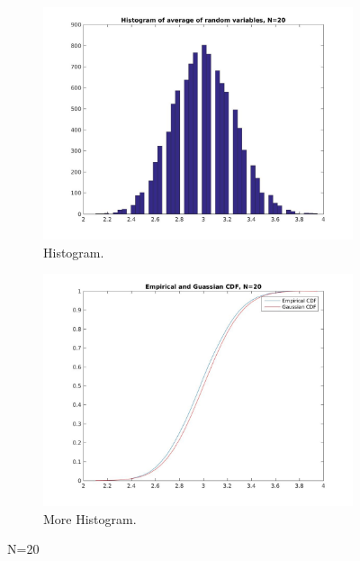 \documentclass[12pt]{article}
\begin{document}
\begin{figure}[h!]
  \centering
  \begin{subfigure}[b]{0.4\linewidth}
    \includegraphics[width=\linewidth]{jpgs/histograms/20_hist.jpg}
    \caption{Histogram.}
  \end{subfigure}
  \begin{subfigure}[b]{0.4\linewidth}
    \includegraphics[width=\linewidth]{jpgs/cdfs/20_cdf.jpg}
    \caption{More Histogram.}
  \end{subfigure}
  \caption{N=20}
\end{figure}
\end{document}
